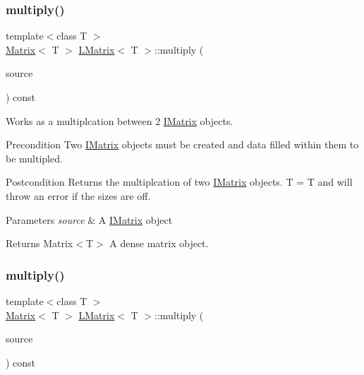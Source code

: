 \subsubsection{\texorpdfstring{multiply()}{multiply()}\hspace{0.1cm}{\footnotesize\ttfamily [2/6]}}
{\footnotesize\ttfamily template$<$class T $>$ \\
\mbox{\hyperlink{class_matrix}{Matrix}}$<$ T $>$ \mbox{\hyperlink{class_l_matrix}{L\+Matrix}}$<$ T $>$\+::multiply (\begin{DoxyParamCaption}\item[{const \mbox{\hyperlink{class_i_matrix}{I\+Matrix}}$<$ \mbox{\hyperlink{class_t_matrix}{T\+Matrix}}$<$ T $>$, T $>$ \&}]{source }\end{DoxyParamCaption}) const}



Works as a multiplcation between 2 \mbox{\hyperlink{class_i_matrix}{I\+Matrix}} objects. 

\begin{DoxyPrecond}{Precondition}
Two \mbox{\hyperlink{class_i_matrix}{I\+Matrix}} objects must be created and data filled within them to be multipled. 
\end{DoxyPrecond}
\begin{DoxyPostcond}{Postcondition}
Returns the multiplcation of two \mbox{\hyperlink{class_i_matrix}{I\+Matrix}} objects. T = T and will throw an error if the sizes are off.
\end{DoxyPostcond}

\begin{DoxyParams}{Parameters}
{\em source} & A \mbox{\hyperlink{class_i_matrix}{I\+Matrix}} object \\
\hline
\end{DoxyParams}
\begin{DoxyReturn}{Returns}
Matrix$<$\+T$>$ A dense matrix object. 
\end{DoxyReturn}
\mbox{\label{class_l_matrix_a09f9f4cc80fda1508e71aaf72f1366ad}} 
\subsubsection{\texorpdfstring{multiply()}{multiply()}\hspace{0.1cm}{\footnotesize\ttfamily [3/6]}}
{\footnotesize\ttfamily template$<$class T $>$ \\
\mbox{\hyperlink{class_matrix}{Matrix}}$<$ T $>$ \mbox{\hyperlink{class_l_matrix}{L\+Matrix}}$<$ T $>$\+::multiply (\begin{DoxyParamCaption}\item[{const \mbox{\hyperlink{class_i_matrix}{I\+Matrix}}$<$ \mbox{\hyperlink{class_l_matrix}{L\+Matrix}}$<$ T $>$, T $>$ \&}]{source }\end{DoxyParamCaption}) const\hspace{0.3cm}{\ttfamily [virtual]}}



